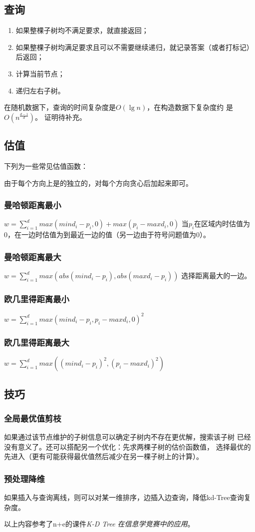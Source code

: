 \subsection{查询}
\begin{enumerate}
	\item 如果整棵子树均不满足要求，就直接返回；
	\item 如果整棵子树均满足要求且可以不需要继续递归，就记录答案（或者打标记）后返回；
	\item 计算当前节点；
	\item 递归左右子树。
\end{enumerate}
在随机数据下，查询的时间复杂度是$O(\lg n)$，在构造数据下复杂度约
是$O(n^\frac{d-1}{d})$。
证明待补充。
\subsection{估值}
下列为一些常见估值函数：

由于每个方向上是的独立的，对每个方向贪心后加起来即可。
\subsubsection{曼哈顿距离最小}
$w=\sum_{i=1}^d{max(mind_i-p_i,0)+max(p_i-maxd_i,0)}$
当$p_i$在区域内时估值为0，在一边时估值为到最近一边的值（另一边由于符号问题值为0）。
\subsubsection{曼哈顿距离最大}
$w=\sum_{i=1}^d{max(abs(mind_i-p_i),abs(maxd_i-p_i))}$
选择距离最大的一边。
\subsubsection{欧几里得距离最小}
$w=\sum_{i=1}^d{max(mind_i-p_i,p_i-maxd_i,0)^2}$
\subsubsection{欧几里得距离最大}
$w=\sum_{i=1}^d{max((mind_i-p_i)^2,(p_i-maxd_i)^2)}$
\subsection{技巧}
\subsubsection{全局最优值剪枝}
如果通过该节点维护的子树信息可以确定子树内不存在更优解，搜索该子树
已经没有意义了。还可以搭配另一个优化：先求两棵子树的估价函数值，
选择最优的先进入（更有可能获得最优值然后减少在另一棵子树上的计算）。
\subsubsection{预处理降维}
如果插入与查询离线，则可以对某一维排序，边插入边查询，降低kd-Tree查询复杂度。

以上内容参考了n+e的课件\emph{K-D Tree 在信息学竞赛中的应用}\cite{kdTree}。
